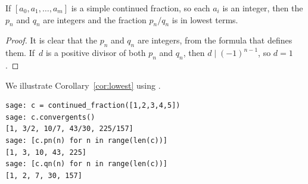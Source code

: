 \begin{corollary}%
\label{cor:lowest}
If $[a_0,a_1,\ldots,a_m]$ is a simple continued fraction,
so each $a_i$ is an integer,
then the $p_n$ and $q_n$ are integers and
the fraction $p_n/q_n$ is in lowest terms.
\end{corollary}
\begin{proof}
  It is clear that the $p_n$ and $q_n$ are integers, from the formula
  that defines them.  If~$d$ is a positive divisor of both $p_n$ and
  $q_n$, then $d\mid (-1)^{n-1}$, so $d=1$.
\end{proof}

\begin{sg}
We illustrate Corollary~\ref{cor:lowest} using \sage.
\begin{verbatim}
sage: c = continued_fraction([1,2,3,4,5])
sage: c.convergents()
[1, 3/2, 10/7, 43/30, 225/157]
sage: [c.pn(n) for n in range(len(c))]
[1, 3, 10, 43, 225]
sage: [c.qn(n) for n in range(len(c))]
[1, 2, 7, 30, 157]
\end{verbatim}
\end{sg}

